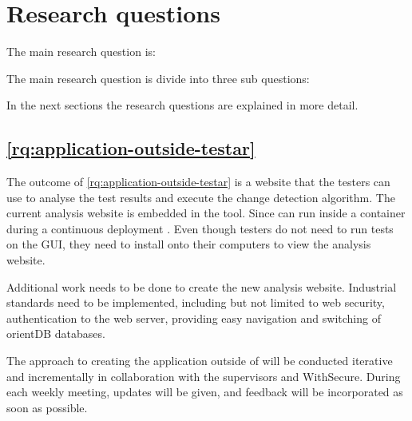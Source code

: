 \section{Research questions} \label{research-questions}

The main research question is:

\textbf{\rqMainQuestion}

The main research question is divide into three sub questions:

\begin{questions}
    \item \rqApplicationOutsideTestar \label{rq:application-outside-testar}
    \item \rqHowMakingChangeDetectionAlgorithm \label{rq:how-making-change-detection-algorithm}
    \item \rqHowToVisualiseResult \label{rq:how-to-visualise-result}
\end{questions}

In the next sections the research questions are explained in more detail.

\subsection{\ref{rq:application-outside-testar} \rqApplicationOutsideTestar}

The outcome of \ref{rq:application-outside-testar} is a website that the testers can use to analyse the test results and execute the change detection algorithm. The current analysis website is embedded in the \testar tool. Since \testar can run inside a container during a continuous deployment \cite{thesisSlomp}. Even though testers do not need \testar to run tests on the GUI, they need to install \testar onto their computers to view the analysis website. 

Additional work needs to be done to create the new analysis website. Industrial standards need to be implemented, including but not limited to web security, authentication to the web server, providing easy navigation and switching of orientDB databases. 

The approach to creating the application outside of \testar will be conducted iterative and incrementally in collaboration with the supervisors and WithSecure. During each weekly meeting, updates will be given, and feedback will be incorporated as soon as possible. 

